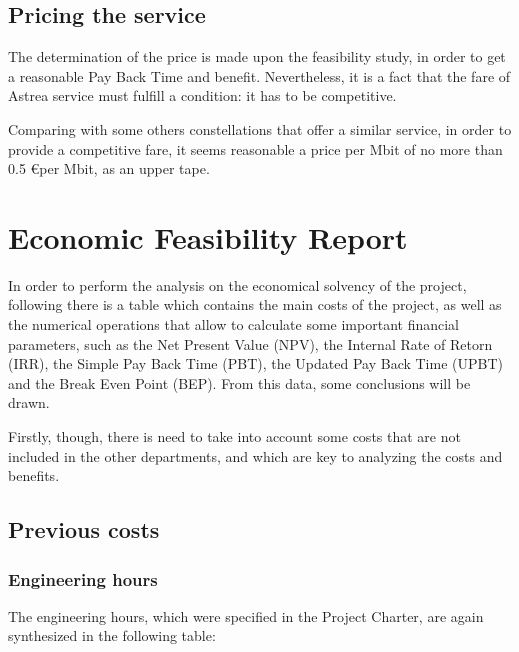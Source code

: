 \subsection{Pricing the service}
The determination of the price is made upon the feasibility study, in order to get a reasonable Pay Back Time and benefit. Nevertheless, it is a fact that the fare of Astrea service must fulfill a condition: it has to be competitive. 

Comparing with some others constellations that offer a similar service, in order to provide a competitive fare, it seems reasonable a price per Mbit of no more than 0.5 \euro per Mbit, as an upper tape.  


\section{Economic Feasibility Report}

In order to perform the analysis on the economical solvency of the project, following there is a table which contains the main costs of the project, as well as the numerical operations that allow to calculate some important financial parameters, such as the Net Present Value (NPV), the Internal Rate of Retorn (IRR), the Simple Pay Back Time (PBT), the Updated Pay Back Time (UPBT) and the Break Even Point (BEP). From this data, some conclusions will be drawn.

Firstly, though, there is need to take into account some costs that are not included in the other departments, and which are key to analyzing the costs and benefits. 
\subsection{Previous costs}
\subsubsection{Engineering hours}
The engineering hours, which were specified in the Project Charter, are again synthesized in the following table: 

